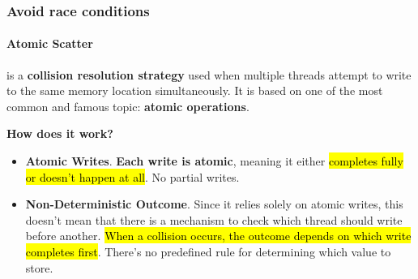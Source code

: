 \subsubsection{Avoid race conditions}

\paragraph{Atomic Scatter}

 is a \textbf{collision resolution strategy} used when multiple threads attempt to write to the same memory location simultaneously. It is based on one of the most common and famous topic: \textbf{atomic operations}.

\highspace
\begin{flushleft}
    \textcolor{Green3}{ \textbf{How does it work?}}
\end{flushleft}
\begin{itemize}
    \item[\textcolor{Green3}{\faIcon{check}}] \textcolor{Green3}{\textbf{Atomic Writes}}. \textbf{Each write is atomic}, meaning it either \hl{completes fully or doesn't happen at all}. No partial writes.

    \item[\textcolor{Red2}{\faIcon{times}}] \textcolor{Red2}{\textbf{Non-Deterministic Outcome}}. Since it relies solely on atomic writes, this doesn't mean that there is a mechanism to check which thread should write before another. \hl{When a collision occurs, the outcome depends on which write completes first}. There's no predefined rule for determining which value to store.
\end{itemize}


